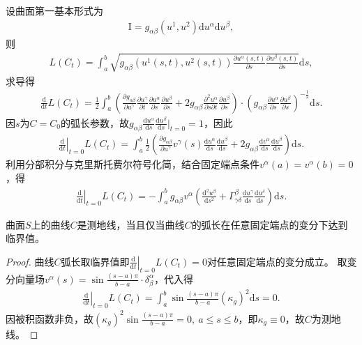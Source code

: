 \documentclass[../../main.tex]{subfiles}%
\begin{document}
设曲面第一基本形式为
\begin{align}
\mathrm{I}=g_{\alpha\beta}(u^1,u^2)\mathrm{d}u^\alpha\mathrm{d}u^\beta,
\end{align}
则
\begin{align}
L(C_t)=\int_{a}^{b}\sqrt{g_{\alpha\beta}(u^1(s,t),u^2(s,t))\frac{\partial u^\alpha(s,t)}{\partial s}\frac{\partial u^\beta(s,t)}{\partial s}}\mathrm{d}s,
\end{align}
求导得
\begin{align*}
\frac{\mathrm{d}}{\mathrm{d}t}L(C_t)=\frac{1}{2}\int_{a}^{b}\left(\frac{\partial g_{\alpha\beta}}{\partial u^\gamma}\frac{\partial u^\gamma}{\partial t}\frac{\partial u^\alpha}{\partial s}\frac{\partial u^\beta}{\partial s}+2g_{\alpha\beta}\frac{\partial^2u^\alpha}{\partial s\partial t}\frac{\partial u^\beta}{\partial s}\right)\cdot\left(g_{\alpha\beta}\frac{\partial u^\alpha}{\partial s}\frac{\partial u^\beta}{\partial s}\right)^{-\frac{1}{2}}\mathrm{d}s.
\end{align*}
因$s$为$C=C_0$的弧长参数，故$g_{\alpha\beta}\frac{\mathrm{d}u^\alpha}{\mathrm{d}s}\frac{\mathrm{d}u^\beta}{\mathrm{d}s}\big|_{t=0}=1$，因此
\begin{align*}
\left.\frac{\mathrm{d}}{\mathrm{d}t}\right|_{t=0}L(C_t)=\int_{a}^{b}\frac{1}{2}\left(\frac{\partial g_{\alpha\beta}}{\partial u^\gamma}v^\gamma(s)\frac{\mathrm{d}u^\alpha}{\mathrm{d}s}\frac{\mathrm{d}u^\beta}{\mathrm{d}s}+2g_{\alpha\beta}\frac{\mathrm{d}v^\alpha}{\mathrm{d}s}\frac{\mathrm{d}u^\beta}{\mathrm{d}s}\right)\mathrm{d}s.
\end{align*}
利用分部积分与克里斯托费尔符号化简，结合固定端点条件$v^\alpha(a)=v^\alpha(b)=0$，得
\begin{align}
\left.\frac{\mathrm{d}}{\mathrm{d}t}\right|_{t=0}L(C_t)=-\int_{a}^{b}g_{\alpha\beta}v^\alpha\left(\frac{\mathrm{d}^2u^\beta}{\mathrm{d}s^2}+\Gamma^\beta_{\gamma\delta}\frac{\mathrm{d}u^\gamma}{\mathrm{d}s}\frac{\mathrm{d}u^\delta}{\mathrm{d}s}\right)\mathrm{d}s.
\end{align}

\begin{theorem}
曲面$S$上的曲线$C$是测地线，当且仅当曲线$C$的弧长在任意固定端点的变分下达到临界值。
\end{theorem}

\begin{proof}
曲线$C$弧长取临界值即$\left.\frac{\mathrm{d}}{\mathrm{d}t}\right|_{t=0}L(C_t)=0$对任意固定端点的变分成立。
取变分向量场$v^\alpha(s)=\sin\frac{(s-a)\pi}{b-a}\cdot\delta^\alpha_\beta$，代入得
\begin{align*}
\left.\frac{\mathrm{d}}{\mathrm{d}t}\right|_{t=0}L(C_t)=\int_{a}^{b}\sin\frac{(s-a)\pi}{b-a}(\kappa_g)^2\mathrm{d}s=0.
\end{align*}
因被积函数非负，故$(\kappa_g)^2\sin\frac{(s-a)\pi}{b-a}=0,\ a\leqslant s\leqslant b$，即$\kappa_g\equiv0$，故$C$为测地线。
\end{proof}
\end{document}

